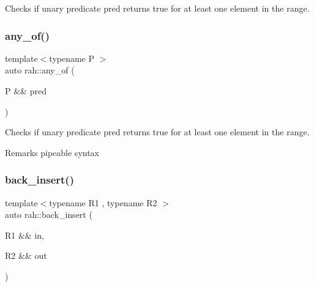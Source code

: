 Checks if unary predicate pred returns true for at least one element in the range. 


\begin{DoxyCodeInclude}{0}
\DoxyCodeLine{    );}
\end{DoxyCodeInclude}
\mbox{\label{namespacerah_aa3f330b2354859d8a9e6df794a1e7a1a}} 
\subsubsection{\texorpdfstring{any\_of()}{any\_of()}\hspace{0.1cm}{\footnotesize\ttfamily [2/2]}}
{\footnotesize\ttfamily template$<$typename P $>$ \\
auto rah\+::any\+\_\+of (\begin{DoxyParamCaption}\item[{P \&\&}]{pred }\end{DoxyParamCaption})}



Checks if unary predicate pred returns true for at least one element in the range. 

\begin{DoxyRemark}{Remarks}
pipeable syntax
\end{DoxyRemark}

\begin{DoxyCodeInclude}{0}
\DoxyCodeLine{        ));}
\end{DoxyCodeInclude}
\mbox{\label{namespacerah_a2734b7f57efb773c6df8ac55b9d040cd}} 
\subsubsection{\texorpdfstring{back\_insert()}{back\_insert()}\hspace{0.1cm}{\footnotesize\ttfamily [1/2]}}
{\footnotesize\ttfamily template$<$typename R1 , typename R2 $>$ \\
auto rah\+::back\+\_\+insert (\begin{DoxyParamCaption}\item[{R1 \&\&}]{in,  }\item[{R2 \&\&}]{out }\end{DoxyParamCaption})}



